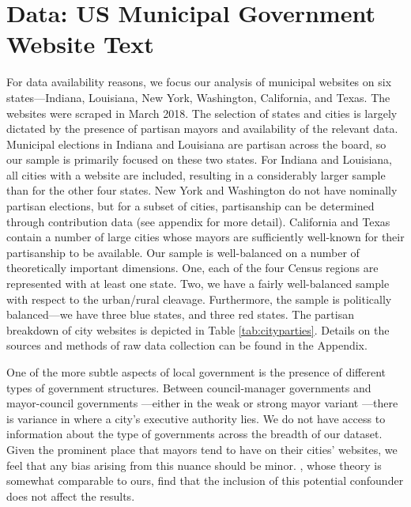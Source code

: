 \documentclass[11pt]{article}
\begin{document}
\section{Data: US Municipal Government Website Text}

For data availability reasons, we focus our analysis of municipal websites on six states---Indiana, Louisiana, New York, Washington, California, and Texas. The websites were scraped in March 2018. The selection of states and cities is largely dictated by the presence of partisan mayors and availability of the relevant data. Municipal elections in Indiana and Louisiana are partisan across the board, so our sample is primarily focused on these two states. For Indiana and Louisiana, all cities with a website are included, resulting in a considerably larger sample than for the other four states. New York and Washington do not have nominally partisan elections, but for a subset of cities, partisanship can be determined through contribution data (see appendix for more detail). California and Texas contain a number of large cities whose mayors are sufficiently well-known for their partisanship to be available. Our sample is well-balanced on a number of theoretically important dimensions. One, each of the four Census regions are represented with at least one state. Two, we have a fairly well-balanced sample with respect to the urban/rural cleavage. Furthermore, the sample is politically balanced---we have three blue states, and three red states.  The partisan breakdown of city websites is depicted in Table \ref{tab:cityparties}. Details on the sources and methods of raw data collection can be found in the Appendix.

 

One of the more subtle aspects of local government is the presence of different types of government structures. Between council-manager governments and mayor-council governments \citep{morgan1992policy}---either in the weak or strong mayor variant \citep{desantis2002city}---there is variance in where a city's executive authority lies. We do not have access to information about the type of governments across the breadth of our dataset. Given the prominent place that mayors tend to have on their cities' websites, we feel that any bias arising from this nuance should be minor. \cite{gerber2011mayors}, whose theory is somewhat comparable to ours, find that the inclusion of this potential confounder does not affect the results.
\end{document}
